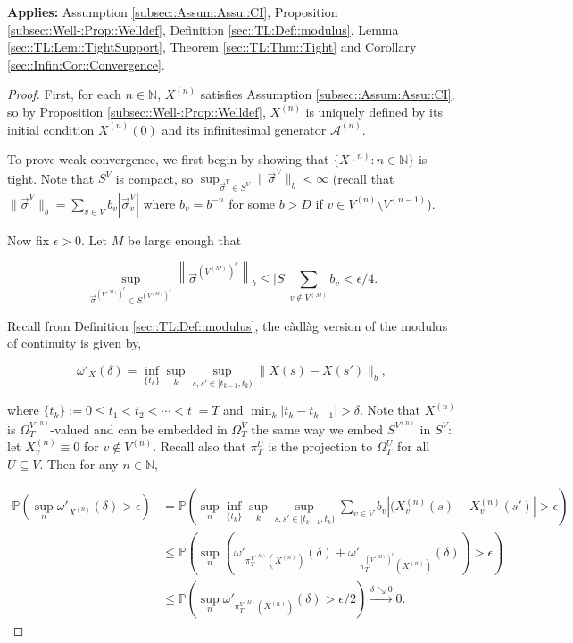 \documentclass[12pt]{article}
\newcommand{\mb}{\mathbb}
\newcommand{\mc}{\mathcal}
\newcommand{\ra}{\rightarrow}
\newcommand{\os}{\overset}
\newcommand{\ep}{\epsilon}
\newcommand{\app}{\textbf{Applies: }}
\newcommand{\ind}{\hspace{24pt}}
\newcommand{\pr}{\mb{P}}							%
\renewcommand{\v}{v}							%
\renewcommand{\U}{U}							%
\renewcommand{\S}{S}							%
\newcommand{\s}{\sigma}							%
\newcommand{\sv}{\vec{\s}}						%
\renewcommand{\b}{b}							%
\newcommand{\T}{T}								%
\renewcommand{\t}{t}							%
\newcommand{\sset}{\Omega}						%
\newcommand{\proj}{\pi}							%
\renewcommand{\tt}{s}							%
\newcommand{\ttt}{s'}							%
\newcommand{\X}{X}								%
\newcommand{\IG}{\mc{A}}						%
\newcommand{\carp}[1]{^{#1}}					%
\newcommand{\vsi}[1]{^{#1}}						%
\newcommand{\cind}[1]{_{#1}}					%
\newcommand{\tp}[1]{(#1)}						%
\newcommand{\ts}[1]{_{#1}}						%
\newcommand{\degr}{D}							%
\newcommand{\sln}[1]{^{(#1)}}					%
\newcommand{\cconst}{M}							%
\newcommand{\cmodu}{\omega'}					%
\newcommand{\pra}[1]{_{#1}}						%
\newcommand{\indx}[1]{_{#1}}					%
\renewcommand{\it}{k}							%
\begin{document}
\app Assumption \ref{subsec::Assum:Assu::CI}, Proposition \ref{subsec::Well-:Prop::Welldef}, Definition \ref{sec::TL:Def::modulus}, Lemma \ref{sec::TL:Lem::TightSupport}, Theorem \ref{sec::TL:Thm::Tight} and Corollary \ref{sec::Infin:Cor::Convergence}.

\begin{proof}
First, for each \(n\in\mb{N}\), \(\X\sln{n}\) satisfies Assumption \ref{subsec::Assum:Assu::CI}, so by Proposition \ref{subsec::Well-:Prop::Welldef}, \(\X\sln{n}\) is uniquely defined by its initial condition \(\X\sln{n}\tp{0}\) and its infinitesimal generator \(\IG\sln{n}\).

\ind To prove weak convergence, we first begin by showing that \(\{\X\sln{n}:n\in \mb{N}\}\) is tight. Note that \(\S\carp{V}\) is compact, so \(\sup_{\sv\vsi{V} \in \S\carp{V}} \|\sv\vsi{V}\|_{\b} < \infty\) (recall that \(\|\sv\vsi{V}\|_{\b} = \sum_{\v \in V} \b\cind{\v} |\sv\cind{\v}\vsi{V}|\) where \(\b\cind{\v} = \b^{-n}\) for some \(\b > \degr\) if \(\v \in V\sln{n}\setminus V\sln{n-1}\)).

\ind Now fix \(\ep > 0\). Let \(\cconst\) be large enough that

\[\sup_{\sv\vsi{\left(V\sln{\cconst}\right)^c} \in \S\carp{\left(V\sln{\cconst}\right)^c}} \left\|\sv\vsi{\left(V\sln{\cconst}\right)^c}\right\|_{\b} \leq |\S|\sum_{\v \notin V\sln{\cconst}} \b\cind{\v} < \ep/4.\]

Recall from Definition \ref{sec::TL:Def::modulus}, the c\`adl\`ag version of the modulus of continuity is given by,

\[\cmodu\pra{\X}(\delta) = \inf_{\{\t\indx{\it}\}} \sup_\it \sup_{\tt,\ttt \in [\t\indx{\it-1},\t\indx{\it})} \|\X\tp{\tt} - \X\tp{\ttt}\|_{\b},\]

where \(\{\t\indx{\it}\} := 0 \leq \t\indx{1} < \t\indx{2} < \cdots < \t\indx{\cdot} = \T\) and \(\min_\it|\t\indx{\it} - \t\indx{\it-1}| > \delta\). Note that \(\X\sln{n}\) is \(\sset\vsi{V\sln{n}}\ts{\T}\)-valued and can be embedded in \(\sset\vsi{V}\ts{\T}\) the same way we embed \(\S\carp{V\sln{n}}\) in \(\S\carp{V}\): let \(\X\sln{n}\cind{\v} \equiv 0\) for \(\v \notin V\sln{n}\). Recall also that \(\proj\vsi{\U}\ts{\T}\) is the projection to \(\sset\vsi{\U}\ts{\T}\) for all \(\U\subseteq V\). Then for any \(n\in \mb{N}\),

\begin{align*}
\pr\left(\sup_n \cmodu\pra{\X\sln{n}}(\delta) > \epsilon\right) &= \pr\left(\sup_n\inf_{\{\t\indx{\it}\}}\sup_\it\sup_{\tt,\ttt \in [\t\indx{\it-1},\t\indx{\it})} \sum_{\v \in V} \b\cind{\v}|(\X\sln{n}\cind{\v}\tp{\tt} - \X\sln{n}\cind{\v}\tp{\ttt}| > \epsilon \right)\\
&\leq \pr\left(\sup_n \left(\cmodu\pra{\proj\vsi{V\sln{\cconst}}\ts{\T}(\X\sln{n})}(\delta) + \cmodu\pra{\proj\vsi{\left(V\sln{\cconst}\right)^c}\ts{\T}(\X\sln{n})}(\delta)\right) > \ep\right)\\
&\leq \pr\left(\sup_n \cmodu\pra{\proj\vsi{V\sln{\cconst}}\ts{\T}(\X\sln{n})}(\delta) > \ep/2\right) \os{\delta\searrow 0}{\ra} 0.
\end{align*}


\end{proof}
\end{document}
